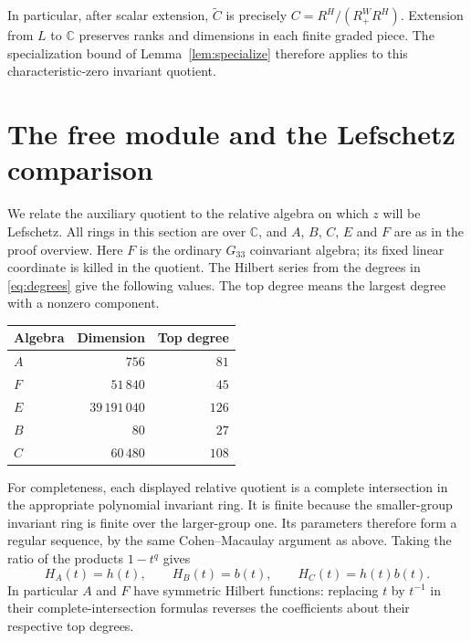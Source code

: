 \documentclass[11pt]{article}
\theoremstyle{definition}
\newcommand{\C}{\mathbb C}
\begin{document}
In particular, after scalar extension, $\widetilde C$ is precisely
$C=R^H/(R^W_+R^H)$. Extension from $L$ to $\C$ preserves ranks
and dimensions in each finite graded piece. The specialization
bound of Lemma~\ref{lem:specialize} therefore applies to this
characteristic-zero invariant quotient.

\section{The free module and the Lefschetz comparison}\label{sec:free}
We relate the auxiliary quotient to the relative algebra on which
$z$ will be Lefschetz. All rings in this section are over $\C$,
and $A$, $B$, $C$, $E$ and $F$ are as in the proof overview. Here $F$ is the ordinary $G_{33}$ coinvariant algebra; its fixed
linear coordinate is killed in the quotient. The Hilbert series
from the degrees in \eqref{eq:degrees} give the following values.
The top degree means the largest degree with a nonzero component.

\begin{center}
\begin{tabular}{@{}lrr@{}}
\toprule
Algebra & Dimension & Top degree\\
\midrule
$A$ & $756$ & $81$\\
$F$ & $51\,840$ & $45$\\
$E$ & $39\,191\,040$ & $126$\\
$B$ & $80$ & $27$\\
$C$ & $60\,480$ & $108$\\
\bottomrule
\end{tabular}
\end{center}

For completeness, each displayed relative quotient is a complete
intersection in the appropriate polynomial invariant ring. It is
finite because the smaller-group invariant ring is finite over the
larger-group one. Its parameters therefore form a regular sequence,
by the same Cohen--Macaulay argument as above. Taking the ratio of
the products $1-t^q$ gives
\begin{equation}\label{eq:Hilbert}
                H_A(t)=h(t),\qquad H_B(t)=b(t),\qquad
                                H_C(t)=h(t)b(t).
\end{equation}
In particular $A$ and $F$ have symmetric Hilbert functions:
replacing $t$ by $t^{-1}$ in their complete-intersection formulas
reverses the coefficients about their respective top degrees.
\end{document}
